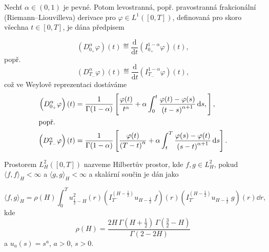 \begin{definice}\label{def:fracder}
    Nechť $\alpha\in \left( 0,1 \right)$ je pevné. Potom levostranná, popř.
    pravostranná frakcionální (Riemann--Liouvilleva) derivace pro
    $\varphi\in L^1 \left( \left[ 0,T \right] \right)$, definovaná pro skoro
    všechna $t\in\left[ 0,T \right]$, je dána předpisem
        
        $$\left( D_{0_+}^\alpha \varphi \right) \left( t \right) \eqdef
        \frac{\mathrm{d}}{\mathrm{d}t}\left( I_{0_+}^{1-\alpha} \varphi \right) \left( t \right) ,$$
    popř.
        $$\left( D_{T_-}^\alpha \varphi \right) \left( t \right) \eqdef
        \frac{\mathrm{d}}{\mathrm{d}t}\left( I_{T_-}^{1-\alpha} \varphi \right) \left( t \right) ,$$
    což ve Weylově reprezentaci dostáváme
\begin{align*}
    \left( D_{0_+}^\alpha \varphi \right) \left( t \right) &=
        \frac{1}{\Gamma(1-\alpha)}\left[ \frac{\varphi(t)}{t^\alpha} + \alpha
        \int_{0}^{t} \frac{\varphi(t)-\varphi(s)}{\left(t-s\right)^{\alpha+1}} 
        \,\mathrm{d} s, \right],\\
    \intertext{popř.}
    \left( D_{T_-}^\alpha \varphi \right) \left( t \right) &=
        \frac{1}{\Gamma(1-\alpha)}\left[ \frac{\varphi(t)}{\left( T-t
        \right)^\alpha} + \alpha \int_{t}^{T} \frac{\varphi(s)-\varphi(t)}{\left(s-t\right)^{\alpha+1}} 
        \,\mathrm{d} s \right].
\end{align*}
\end{definice}




\begin{definice}
    Prostorem $L^2_H \left( \left[ 0,T \right] \right)$ nazveme Hilbertův
    prostor, kde $f,g\in L^2_H$, pokud $\langle f,f \rangle_H < \infty$ a
    $\langle g,g \rangle_H < \infty$ a skalární součin je dán jako

    $$ \langle f,g \rangle_H = \rho (H) \int_0^T u_{\frac{1}{2}-H}^2 (r)
    \left(I_{T^-}^{\left(H-\frac{1}{2}\right)} u_{H-\frac{1}{2}}\; f \right) (r)
    \left(I_{T^-}^{\left(H-\frac{1}{2}\right)} u_{H-\frac{1}{2}}\; g \right)
    (r) \dd r, $$
    kde 
    $$ \rho (H) = \frac{2H \, \Gamma (H+\frac{1}{2}) \, \Gamma(\frac{3}{2}-H)}
    {\Gamma (2-2H)}$$
    a $u_a (s) = s^a$, $a>0$, $s>0$.

\end{definice}


